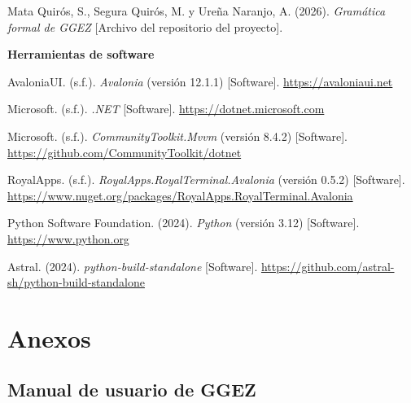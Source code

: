 Mata Quirós, S., Segura Quirós, M. y Ureña Naranjo, A. (2026). \emph{Gramática formal de GGEZ} [Archivo  del repositorio del proyecto].

\textbf{Herramientas de software}

AvaloniaUI. (s.f.). \emph{Avalonia} (versión 12.1.1) [Software]. \url{https://avaloniaui.net}

Microsoft. (s.f.). \emph{.NET} [Software]. \url{https://dotnet.microsoft.com}

Microsoft. (s.f.). \emph{CommunityToolkit.Mvvm} (versión 8.4.2) [Software]. \url{https://github.com/CommunityToolkit/dotnet}

RoyalApps. (s.f.). \emph{RoyalApps.RoyalTerminal.Avalonia} (versión 0.5.2) [Software]. \url{https://www.nuget.org/packages/RoyalApps.RoyalTerminal.Avalonia}

Python Software Foundation. (2024). \emph{Python} (versión 3.12) [Software]. \url{https://www.python.org}

Astral. (2024). \emph{python-build-standalone} [Software]. \url{https://github.com/astral-sh/python-build-standalone}

\endgroup

\newpage
\section{Anexos}

\subsection{Manual de usuario de GGEZ}

\newcommand{\manualseccion}[1]{\subsubsection*{#1}}

